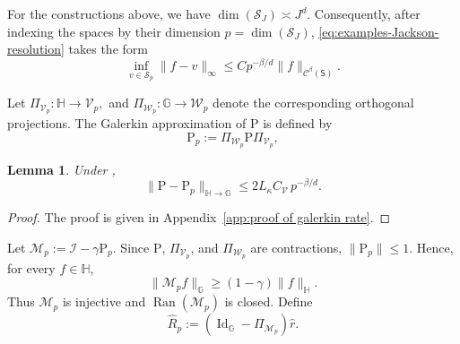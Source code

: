 \documentclass{article}
\newtheorem{lemma}[proposition]{Lemma}
\theoremstyle{definition}
\theoremstyle{remark}
\theoremstyle{plain}
\newcommand{\MKQ}{\mathrm{P}}
\newcommand{\dsieve}{p}
\numberwithin{equation}{section}
\begin{document}
For the constructions above, we have 
\(
    \dim(\mathcal S_J)\asymp J^d .
\)
Consequently, after indexing the spaces by their dimension
\(\dsieve=\dim(\mathcal S_J)\), \eqref{eq:examples-Jackson-resolution}
takes the form
\begin{equation}
\label{eq:examples-Jackson-dimension}
    \inf_{v\in\mathcal S_{\dsieve}}
    \|f-v\|_{\infty}
    \leq
    C \dsieve^{-\beta/d}
    \|f\|_{\mathcal C^\beta(\mathsf S)} .
\end{equation}

Let 
\(
    \Pi_{\mathcal V_{\dsieve}}:\mathbb H\to\mathcal V_{\dsieve},
 \) and 
\(    \Pi_{\mathcal W_{\dsieve}}:\mathbb G\to\mathcal W_{\dsieve}
\) denote the corresponding orthogonal projections.
The Galerkin approximation of \(\MKQ\)  is
defined by
\begin{equation}
\label{eq:Galerkin-Pk-Mk}
    \MKQ_{\dsieve}
    :=
    \Pi_{\mathcal W_{\dsieve}}
    \MKQ
    \Pi_{\mathcal V_{\dsieve}},
\end{equation}
\begin{lemma}
\label{lem:Galerkin-approximation-rate}
Under , 
\begin{equation}
\label{eq:Galerkin-approximation-rate}
    \|\MKQ-\MKQ_{\dsieve}\|_{\mathbb H\to\mathbb G}
    \leq 2 L_{\kappa} C_{\mathcal V}\,
    \dsieve^{-\beta/d}.
\end{equation}
\end{lemma}
\begin{proof}
    The proof is given in Appendix~\ref{app:proof of galerkin rate}.
\end{proof}




Let \(\mathcal M_{\dsieve}
    :=
    \mathcal I-\gamma\MKQ_{\dsieve}.\) Since $\MKQ$, $\Pi_{\mathcal V_\dsieve}$, and $\Pi_{\mathcal W_\dsieve}$ are contractions, $\|\MKQ_\dsieve\|\leq1$. Hence, for every $f\in\mathbb H$,
\begin{equation}
\label{eq:Mk-lower-bound}
    \|\mathcal M_\dsieve f\|_{\mathbb G}
    \geq
    (1-\gamma)\|f\|_{\mathbb H}.
\end{equation}
Thus $\mathcal M_\dsieve$ is injective and $\operatorname{Ran}(\mathcal M_\dsieve)$ is closed. Define
\begin{equation}
\label{eq:intermediate-rewards}
    \widehat R_\dsieve
    :=
    (\operatorname{Id}_{\mathbb G}-\Pi_{\mathcal M_\dsieve})\widehat r.
\end{equation}
\end{document}

